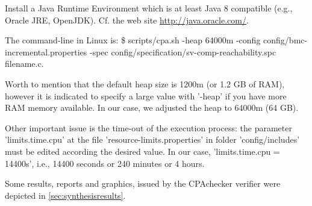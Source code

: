 Install a Java Runtime Environment which is at least Java 8 compatible (e.g., Oracle JRE, OpenJDK). Cf. the web site \url{http://java.oracle.com/}.

The command-line in Linux is: \$ scripts/cpa.sh -heap 64000m -config config/bmc-incremental.properties -spec config/specification/sv-comp-reachability.spc filename.c. 

Worth to mention that the default heap size is 1200m (or 1.2 GB of RAM), however it is indicated to specify a large value with '-heap' if you have more RAM memory available. In our case, we adjusted the heap to 64000m (64 GB). 

Other important issue is the time-out of the execution process: the parameter 'limits.time.cpu' at the file 'resource-limits.properties' in folder 'config/includes' must be edited according the desired value. In our case, 'limits.time.cpu = 14400s', i.e., 14400 seconds or 240 minutes or 4 hours.

Some results, reports and graphics, issued by the CPAchecker verifier were depicted in \ref{sec:synthesisresults}.

